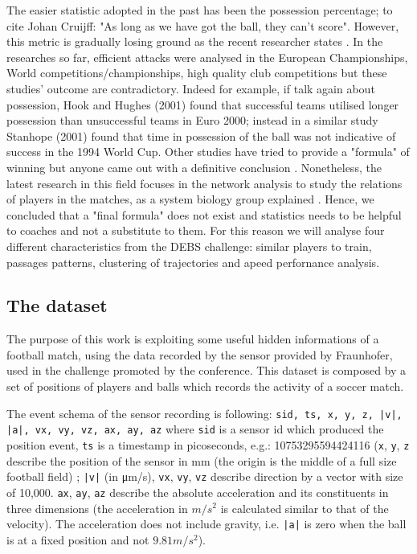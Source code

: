 \documentclass{acm_proc_article-sp-sigmod07}
\begin{document}
The easier statistic adopted in the past has been the possession percentage; to cite Johan Cruijff: "As long as we have got the ball, they can't score". However, this metric is gradually losing ground as the recent researcher states \cite{newyorkredbulls}. In the researches so far, efficient attacks were analysed in the European Championships, World competitions/championships, high quality club competitions but these studies' outcome are contradictory. Indeed for example, if talk again about possession, Hook and Hughes (2001) found that successful teams utilised longer possession than unsuccessful teams in Euro 2000; instead in a similar study Stanhope (2001) found that time in possession of the ball was not indicative of success in the 1994 World Cup. Other studies have tried to provide a "formula" of winning but anyone came out with a definitive conclusion \cite{lago2010game}. Nonetheless, the latest research in this field focuses in the network analysis to study the relations of players in the matches, as a system biology group explained 	\cite{duch2010quantifying}. Hence, we concluded that a "final formula" does not exist and statistics needs to be helpful to coaches and not a substitute to them. For this reason we will analyse four different characteristics from the DEBS challenge: similar players to train, passages patterns, clustering of trajectories and apeed perfornance analysis.

\subsection{The dataset}
The purpose of this work is exploiting some useful hidden informations of a football match, using the data recorded by the sensor provided by Fraunhofer, used in the challenge promoted by the \cite{debs2013} conference. This dataset is composed by a set of positions of players and balls which records the activity of a soccer match.

The event schema of the sensor recording is following: \texttt{sid, ts, x, y, z, |v|, |a|, vx, vy, vz, ax, ay, az} where \texttt{sid} is a sensor id which produced the position event, \texttt{ts} is a timestamp in picoseconds, e.g.: 10753295594424116 (\texttt{x}, \texttt{y}, \texttt{z} describe the position of the sensor in mm (the origin is the middle of a full size football field) ; \texttt{|v|} (in μm/s), \texttt{vx}, \texttt{vy}, \texttt{vz} describe direction by a vector with size of 10,000. \texttt{ax}, \texttt{ay}, \texttt{az} describe the absolute acceleration and its constituents in three dimensions (the acceleration in $m/s^2$ is calculated similar to that of the velocity). The acceleration does not include gravity, i.e. \texttt{|a|} is zero when the ball is at a fixed position and not $9.81 m/s^2$). 
\end{document}
